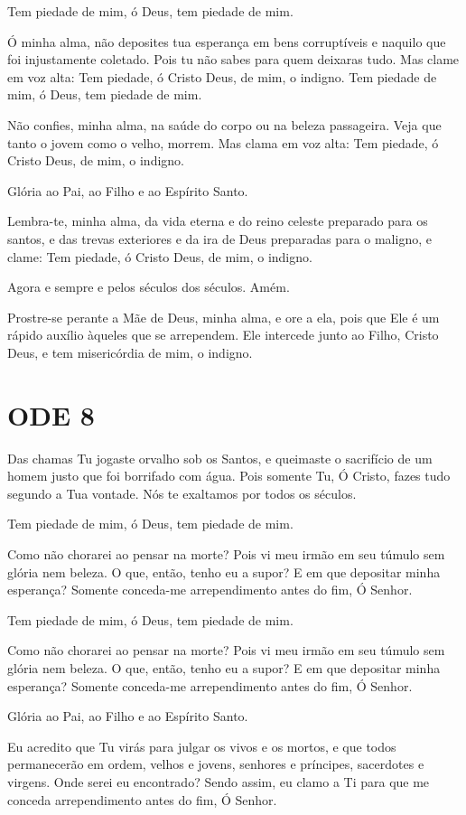 \documentclass{subfiles}
\begin{document}
Tem piedade de mim, ó Deus, tem piedade de mim.

Ó minha alma, não deposites tua esperança em bens corruptíveis e
naquilo que foi injustamente coletado. Pois tu não sabes para quem deixaras
tudo. Mas clame em voz alta: Tem piedade, ó Cristo Deus, de mim, o indigno.
Tem piedade de mim, ó Deus, tem piedade de mim.

Não confies, minha alma, na saúde do corpo ou na beleza passageira.
Veja que tanto o jovem como o velho, morrem. Mas clama em voz alta: Tem
piedade, ó Cristo Deus, de mim, o indigno.

Glória ao Pai, ao Filho e ao Espírito Santo.

Lembra-te, minha alma, da vida eterna e do reino celeste preparado
para os santos, e das trevas exteriores e da ira de Deus preparadas para o
maligno, e clame: Tem piedade, ó Cristo Deus, de mim, o indigno.

Agora e sempre e pelos séculos dos séculos. Amém.

\theotokion{}Prostre-se perante a Mãe de Deus, minha alma, e ore a ela, pois
que Ele é um rápido auxílio àqueles que se arrependem. Ele intercede junto ao
Filho, Cristo Deus, e tem misericórdia de mim, o indigno.


\section*{ODE 8}

\eirmos{}Das chamas Tu jogaste orvalho sob os Santos, e queimaste o sacrifício
de um homem justo que foi borrifado com água. Pois somente Tu, Ó Cristo,
fazes tudo segundo a Tua vontade. Nós te exaltamos por todos os séculos.

Tem piedade de mim, ó Deus, tem piedade de mim.

Como não chorarei ao pensar na morte? Pois vi meu irmão em seu
túmulo sem glória nem beleza. O que, então, tenho eu a supor? E em que
depositar minha esperança? Somente conceda-me arrependimento antes do
fim, Ó Senhor.

Tem piedade de mim, ó Deus, tem piedade de mim.

Como não chorarei ao pensar na morte? Pois vi meu irmão em seu
túmulo sem glória nem beleza. O que, então, tenho eu a supor? E em que
depositar minha esperança? Somente conceda-me arrependimento antes do
fim, Ó Senhor.

Glória ao Pai, ao Filho e ao Espírito Santo.

Eu acredito que Tu virás para julgar os vivos e os mortos, e que todos
permanecerão em ordem, velhos e jovens, senhores e príncipes, sacerdotes e
virgens. Onde serei eu encontrado? Sendo assim, eu clamo a Ti para que me
conceda arrependimento antes do fim, Ó Senhor.
\end{document}

